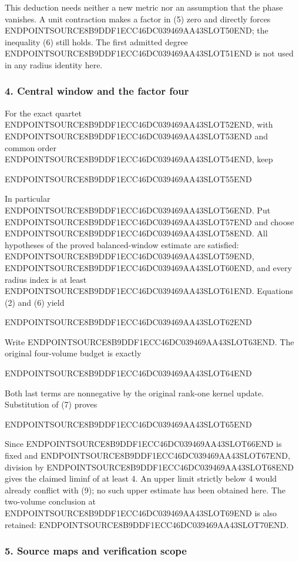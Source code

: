 This deduction needs neither a new metric nor an assumption that the phase vanishes. A unit contraction makes a factor in (5) zero and directly forces ENDPOINTSOURCE8B9DDF1ECC46DC039469AA43SLOT50END; the inequality (6) still holds. The first admitted degree ENDPOINTSOURCE8B9DDF1ECC46DC039469AA43SLOT51END is not used in any radius identity here.

\subsubsection{4. Central window and the factor four}\label{endpoint-four_volume_threshold--central-window-and-the-factor-four}

For the exact quartet ENDPOINTSOURCE8B9DDF1ECC46DC039469AA43SLOT52END, with ENDPOINTSOURCE8B9DDF1ECC46DC039469AA43SLOT53END and common order ENDPOINTSOURCE8B9DDF1ECC46DC039469AA43SLOT54END, keep

ENDPOINTSOURCE8B9DDF1ECC46DC039469AA43SLOT55END

In particular ENDPOINTSOURCE8B9DDF1ECC46DC039469AA43SLOT56END. Put ENDPOINTSOURCE8B9DDF1ECC46DC039469AA43SLOT57END and choose ENDPOINTSOURCE8B9DDF1ECC46DC039469AA43SLOT58END. All hypotheses of the proved balanced-window estimate are satisfied: ENDPOINTSOURCE8B9DDF1ECC46DC039469AA43SLOT59END, ENDPOINTSOURCE8B9DDF1ECC46DC039469AA43SLOT60END, and every radius index is at least ENDPOINTSOURCE8B9DDF1ECC46DC039469AA43SLOT61END. Equations (2) and (6) yield

ENDPOINTSOURCE8B9DDF1ECC46DC039469AA43SLOT62END

Write ENDPOINTSOURCE8B9DDF1ECC46DC039469AA43SLOT63END. The original four-volume budget is exactly

ENDPOINTSOURCE8B9DDF1ECC46DC039469AA43SLOT64END

Both last terms are nonnegative by the original rank-one kernel update. Substitution of (7) proves

ENDPOINTSOURCE8B9DDF1ECC46DC039469AA43SLOT65END

Since ENDPOINTSOURCE8B9DDF1ECC46DC039469AA43SLOT66END is fixed and ENDPOINTSOURCE8B9DDF1ECC46DC039469AA43SLOT67END, division by ENDPOINTSOURCE8B9DDF1ECC46DC039469AA43SLOT68END gives the claimed liminf of at least 4. An upper limit strictly below 4 would already conflict with (9); no such upper estimate has been obtained here. The two-volume conclusion at ENDPOINTSOURCE8B9DDF1ECC46DC039469AA43SLOT69END is also retained: ENDPOINTSOURCE8B9DDF1ECC46DC039469AA43SLOT70END.

\subsubsection{5. Source maps and verification scope}\label{endpoint-four_volume_threshold--source-maps-and-verification-scope}

